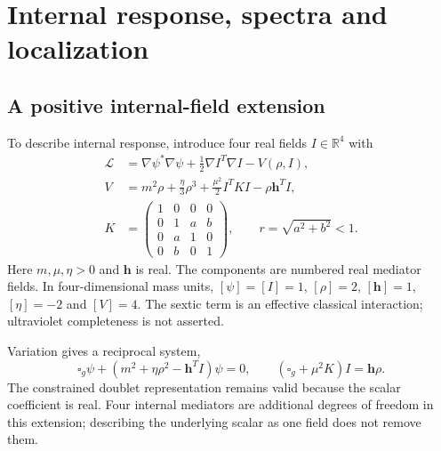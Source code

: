 \documentclass[aip,adv,reprint,onecolumn,amsmath,amssymb]{revtex4-2}
\newcommand{\R}{\mathbb R}
\begin{document}
\section{Internal response, spectra and localization}\label{app:internal}
\subsection{A positive internal-field extension}
To describe internal response, introduce four real fields $I\in\R^4$ with
\begin{align}
 \mathcal L&=\nabla\psi^*\nabla\psi+\tfrac12\nabla I^T\nabla I-V(\rho,I),\\
 V&=m^2\rho+\frac\eta3\rho^3+\frac{\mu^2}{2}I^TKI-\rho\bm h^TI,
 \label{eq:potential}\\
 K&=\begin{pmatrix}1&0&0&0\\0&1&a&b\\0&a&1&0\\0&b&0&1\end{pmatrix},\qquad
 r=\sqrt{a^2+b^2}<1.
 \label{eq:K}
\end{align}
Here $m,\mu,\eta>0$ and $\bm h$ is real. The components are numbered real mediator fields. In four-dimensional mass units, $[\psi]=[I]=1$, $[\rho]=2$, $[\bm h]=1$, $[\eta]=-2$ and $[V]=4$. The sextic term is an effective classical interaction; ultraviolet completeness is not asserted.

Variation gives a reciprocal system,
\begin{equation}
 \square_g\psi+(m^2+\eta\rho^2-\bm h^TI)\psi=0,\qquad
 (\square_g+\mu^2K)I=\bm h\rho.
 \label{eq:coupled}
\end{equation}
The constrained doublet representation remains valid because the scalar coefficient is real. Four internal mediators are additional degrees of freedom in this extension; describing the underlying scalar as one field does not remove them.
\end{document}
